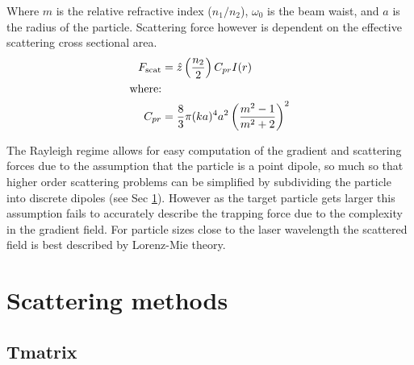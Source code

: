 Where $m$ is the relative refractive index ($n_1/n_2$), $\omega_0$ is the beam waist, and $a$ is the radius of the particle. Scattering force however is dependent on the effective scattering cross sectional area. 
\begin{align}
  F_{\rm scat}
  &= \hat{z} \left(\frac{n_2}{2}\right) C_{pr} I(r) \\
  \text{where:} \nonumber \\
  C_{pr} &= \frac{8}{3} \pi (ka)^4 a^2 \left(\frac{m^2-1}{m^2+2}\right)^2
\end{align}

The Rayleigh regime allows for easy computation of the gradient and scattering forces due to the assumption that the particle is a point dipole, so much so that higher order scattering problems can be simplified by subdividing the particle into discrete dipoles (see Sec \ref{sec:scattering}). However as the target particle gets larger this assumption fails to accurately describe the trapping force due to the complexity in the gradient field. For particle sizes close to the laser wavelength the scattered field is best described by Lorenz-Mie theory. 


\section{Scattering methods}
\label{sec:scattering}


\subsection{Tmatrix}

